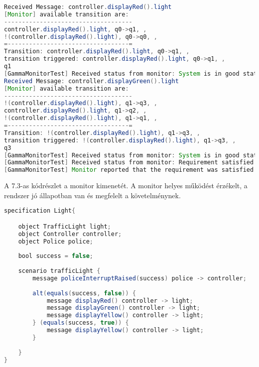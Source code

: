 \begin{lstlisting}[language=java, frame=single, float=ht!, caption={Monitor kimenete.},captionpos=b]
Received Message: controller.displayRed().light
[Monitor] available transition are: 
------------------------------------
controller.displayRed().light, q0->q1, , 
!(controller.displayRed().light), q0->q0, , 
=----------------------------------=
Transition: controller.displayRed().light, q0->q1, , 
transition triggered: controller.displayRed().light, q0->q1, , 
q1
[GammaMonitorTest] Received status from monitor: System is in good state.
Received Message: controller.displayGreen().light
[Monitor] available transition are: 
------------------------------------
!(controller.displayRed().light), q1->q3, , 
controller.displayRed().light, q1->q2, , 
!(controller.displayRed().light), q1->q1, , 
=----------------------------------=
Transition: !(controller.displayRed().light), q1->q3, , 
transition triggered: !(controller.displayRed().light), q1->q3, , 
q3
[GammaMonitorTest] Received status from monitor: System is in good state.
[GammaMonitorTest] Received status from monitor: Requirement satisfied
[GammaMonitorTest] Monitor reported that the requirement was satisfied
\end{lstlisting}

A 7.3-as kódrészlet a monitor kimenetét.
A monitor helyes működést érzékelt, a rendszer jó állapotban van és megfelelt a követelménynek.

\begin{lstlisting}[language=java, frame=single, float=ht!, caption={Szenárió szöveges leírása.},captionpos=b]
specification Light{

    object TrafficLight light;
    object Controller controller;
    object Police police;
    
    bool success = false;
    
    scenario trafficLight {
        message policeInterruptRaised(success) police -> controller;
        
        alt(equals(success, false)) {
            message displayRed() controller -> light;
            message displayGreen() controller -> light;
            message displayYellow() controller -> light;
        } (equals(success, true)) {
            message displayYellow() controller -> light;
        }
        
    }
}
\end{lstlisting}

